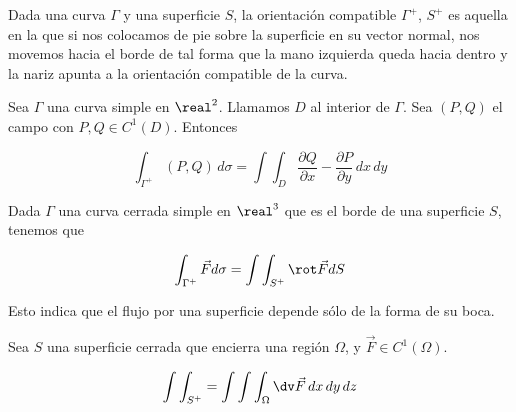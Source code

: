 \documentclass[nochap]{apuntes}
\begin{document}
\begin{defn}
Dada una curva $\Gamma$ y una superficie $S$, la orientación compatible $\Gamma^+$, $S^+$ es aquella en la que si nos colocamos de pie sobre la superficie en su vector normal, nos movemos hacia el borde de tal forma que la mano izquierda queda hacia dentro y la nariz apunta a la orientación compatible de la curva.\end{defn}


\begin{theorem}
Sea $\Gamma$ una curva simple en $\real^2$. Llamamos $D$ al interior de $\Gamma$. Sea $(P,Q)$ el campo con $P,Q\in C^1(D)$. Entonces

\[ \int_{\Gamma^+} (P,Q)\,d\sigma = \int\int_D \frac{\partial Q}{\partial x}-\frac{\partial P}{\partial y}\,dx\,dy\]
\end{theorem}

\begin{theorem}
Dada $\Gamma$ una curva cerrada simple en $\real^3$ que es el borde de una superficie $S$, tenemos que 

\[ \int_{\Gamma^+}\vec{F}d\sigma =\int\int_{S^+}\rot \vec{F}dS \]

Esto indica que el flujo por una superficie depende sólo de la forma de su boca.
\end{theorem}

\begin{theorem}
Sea $S$ una superficie cerrada que encierra una región $\Omega$, y $\vec{F}\in C^1(\Omega)$.

\[ \int\int_{S^+} = \int\int\int_\Omega \dv \vec{F}\, dx\, dy\, dz \]
\end{theorem}

\printindex
\end{document}
